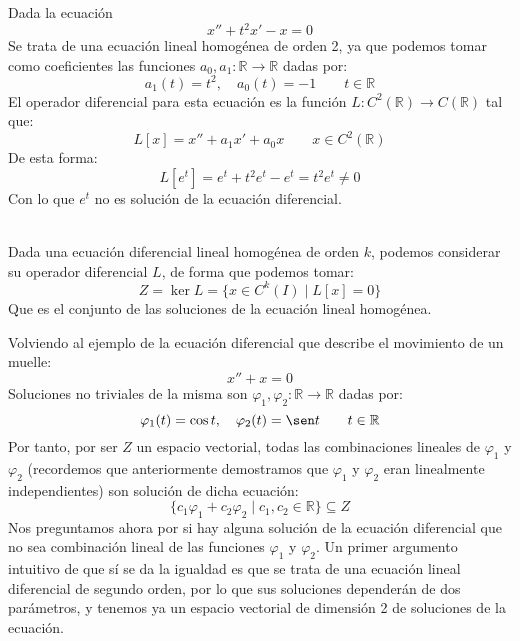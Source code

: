 \begin{ejemplo}
    Dada la ecuación
    \begin{equation*}
        x'' + t^2 x' - x = 0
    \end{equation*}
    Se trata de una ecuación lineal homogénea de orden 2, ya que podemos tomar como coeficientes las funciones $a_0,a_1:\mathbb{R}\rightarrow\mathbb{R}$ dadas por:
    \begin{equation*}
        a_1(t) = t^2, \quad a_0(t) = -1 \qquad t\in \mathbb{R}
    \end{equation*}
    El operador diferencial para esta ecuación es la función $L:C^2(\mathbb{R})\rightarrow C(\mathbb{R})$ tal que:
    \begin{equation*}
        L[x] = x'' + a_1 x' + a_0 x \qquad x\in C^2(\mathbb{R})
    \end{equation*}
    De esta forma:
    \begin{equation*}
        L[e^t] = e^t + t^2 e^t - e^t = t^2 e^t \neq 0
    \end{equation*}
    Con lo que $e^t$ no es solución de la ecuación diferencial.
\end{ejemplo}~\\

\noindent
Dada una ecuación diferencial lineal homogénea de orden $k$, podemos considerar su operador diferencial $L$, de forma que podemos tomar:
\begin{equation*}
    Z = \ker L =  \{x \in C^k(I) \mid L[x] = 0\}
\end{equation*}
Que es el conjunto de las soluciones de la ecuación lineal homogénea.

\begin{ejemplo}
    Volviendo al ejemplo de la ecuación diferencial que describe el movimiento de un muelle:
    \begin{equation*}
        x'' + x = 0
    \end{equation*}
    Soluciones no triviales de la misma son $\varphi_1,\varphi_2:\mathbb{R}\rightarrow\mathbb{R}$ dadas por:
    \begin{equation*}
        \varphi_1(t) = \cos t, \quad \varphi_2(t) = \sen t  \qquad t\in \mathbb{R}
    \end{equation*}
    Por tanto, por ser $Z$ un espacio vectorial, todas las combinaciones lineales de $\varphi_1$ y $\varphi_2$ (recordemos que anteriormente demostramos que $\varphi_1$ y $\varphi_2$ eran linealmente independientes) son solución de dicha ecuación:
    \begin{equation*}
        \{c_1\varphi_1 + c_2\varphi_2 \mid c_1,c_2\in \mathbb{R}\} \subseteq Z
    \end{equation*}
    Nos preguntamos ahora por si hay alguna solución de la ecuación diferencial que no sea combinación lineal de las funciones $\varphi_1$ y $\varphi_2$. Un primer argumento intuitivo de que sí se da la igualdad es que se trata de una ecuación lineal diferencial de segundo orden, por lo que sus soluciones dependerán de dos parámetros, y tenemos ya un espacio vectorial de dimensión 2 de soluciones de la ecuación.
\end{ejemplo}

